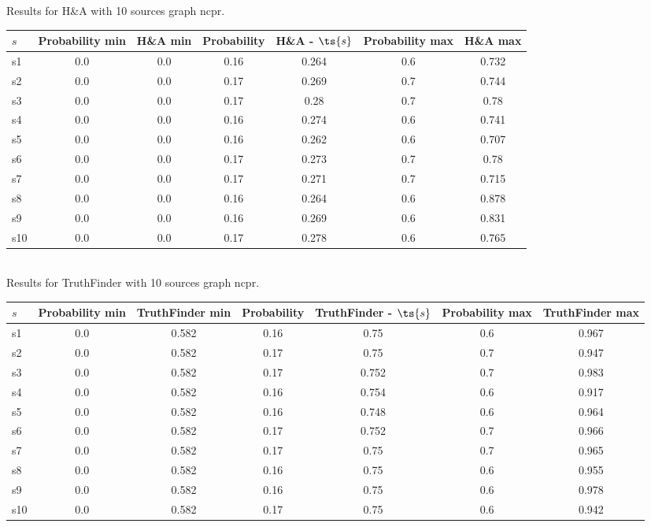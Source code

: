 \documentclass{article}
\begin{document}
\noindent Results for H\&A with 10 sources graph ncpr.

\noindent\begin{tabular}{|l|c|c|c|c|c|c|}
\hline
$s$& Probability min & H\&A min & Probability & H\&A - $\ts{s}$ & Probability max & H\&A max\\
\hline
s1 &0.0 & 0.0 & 0.16 & 0.264 & 0.6 & 0.732\\
\hline
s2 &0.0 & 0.0 & 0.17 & 0.269 & 0.7 & 0.744\\
\hline
s3 &0.0 & 0.0 & 0.17 & 0.28 & 0.7 & 0.78\\
\hline
s4 &0.0 & 0.0 & 0.16 & 0.274 & 0.6 & 0.741\\
\hline
s5 &0.0 & 0.0 & 0.16 & 0.262 & 0.6 & 0.707\\
\hline
s6 &0.0 & 0.0 & 0.17 & 0.273 & 0.7 & 0.78\\
\hline
s7 &0.0 & 0.0 & 0.17 & 0.271 & 0.7 & 0.715\\
\hline
s8 &0.0 & 0.0 & 0.16 & 0.264 & 0.6 & 0.878\\
\hline
s9 &0.0 & 0.0 & 0.16 & 0.269 & 0.6 & 0.831\\
\hline
s10 &0.0 & 0.0 & 0.17 & 0.278 & 0.6 & 0.765\\
\hline
\end{tabular}\\

\noindent Results for TruthFinder with 10 sources graph ncpr.

\noindent\begin{tabular}{|l|c|c|c|c|c|c|}
\hline
$s$& Probability min & TruthFinder min & Probability & TruthFinder - $\ts{s}$ & Probability max & TruthFinder max\\
\hline
s1 &0.0 & 0.582 & 0.16 & 0.75 & 0.6 & 0.967\\
\hline
s2 &0.0 & 0.582 & 0.17 & 0.75 & 0.7 & 0.947\\
\hline
s3 &0.0 & 0.582 & 0.17 & 0.752 & 0.7 & 0.983\\
\hline
s4 &0.0 & 0.582 & 0.16 & 0.754 & 0.6 & 0.917\\
\hline
s5 &0.0 & 0.582 & 0.16 & 0.748 & 0.6 & 0.964\\
\hline
s6 &0.0 & 0.582 & 0.17 & 0.752 & 0.7 & 0.966\\
\hline
s7 &0.0 & 0.582 & 0.17 & 0.75 & 0.7 & 0.965\\
\hline
s8 &0.0 & 0.582 & 0.16 & 0.75 & 0.6 & 0.955\\
\hline
s9 &0.0 & 0.582 & 0.16 & 0.75 & 0.6 & 0.978\\
\hline
s10 &0.0 & 0.582 & 0.17 & 0.75 & 0.6 & 0.942\\
\hline
\end{tabular}\\
\end{document}
